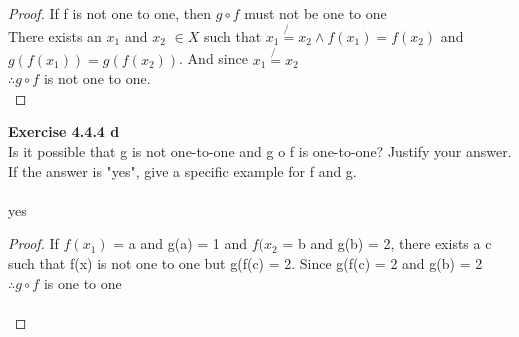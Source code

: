 \documentclass[11pt]{article}
\begin{document}
\begin{proof}
If f is not one to one, then $g \circ f$ must not be one to one\\
There exists an $x_1$ and $x_2$ $\in X$ such that $x_1 \not{=} x_2 \wedge f(x_1) = f(x_2)$ and $g(f(x_1)) = g(f(x_2))$. And since $x_1 \not{=} x_2$\\
$\therefore g \circ f$ is not one to one.\\
\end{proof}
\noindent \textbf{Exercise 4.4.4 d}\\
Is it possible that g is not one-to-one and g o f is one-to-one? Justify your answer. If the answer is "yes", give a specific example for f and g.\\\\
yes\\
\begin{proof}
If $f(x_1)$ = a and g(a) = 1 and $f(x_2$ = b and g(b) = 2, there exists a c such that f(x) is not one to one but g(f(c) = 2. Since g(f(c) = 2 and g(b) = 2\\
$\therefore g \circ f$ is one to one\\
\\
\end{proof}
\end{document}
